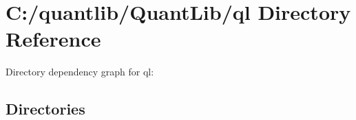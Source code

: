 \section{C\+:/quantlib/\+Quant\+Lib/ql Directory Reference}
\label{dir_958d2abebb9d0797c141a9841f9d5d39}
Directory dependency graph for ql\+:
\subsection*{Directories}
\begin{DoxyCompactItemize}
\end{DoxyCompactItemize}
